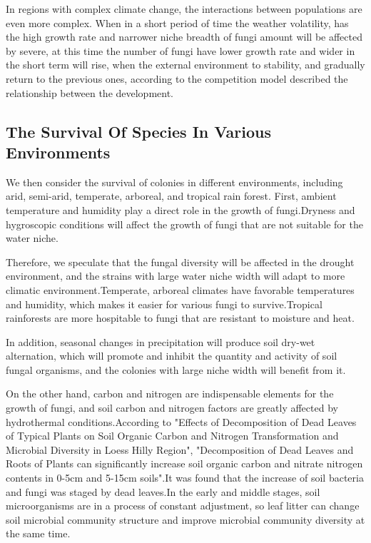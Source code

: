 \documentclass[12pt]{article}
\begin{document}
In regions with complex climate change, the interactions between populations are even more complex. When in a short period of time the weather volatility, has the high growth rate and narrower niche breadth of fungi amount will be affected by severe, at this time the number of fungi have lower growth rate and wider in the short term will rise, when the external environment to stability, and gradually return to the previous ones, according to the competition model described the relationship between the development.\par 

\subsection{The Survival Of Species In Various Environments}
We then consider the survival of colonies in different environments, including arid, semi-arid, temperate, arboreal, and tropical rain forest.
First, ambient temperature and humidity play a direct role in the growth of fungi.Dryness and hygroscopic conditions will affect the growth of fungi that are not suitable for the water niche. \par 

Therefore, we speculate that the fungal diversity will be affected in the drought environment, and the strains with large water niche width will adapt to more climatic environment.Temperate, arboreal climates have favorable temperatures and humidity, which makes it easier for various fungi to survive.Tropical rainforests are more hospitable to fungi that are resistant to moisture and heat.\par 

In addition, seasonal changes in precipitation will produce soil dry-wet alternation, which will promote and inhibit the quantity and activity of soil fungal organisms, and the colonies with large niche width will benefit from it.\par 

On the other hand, carbon and nitrogen are indispensable elements for the growth of fungi, and soil carbon and nitrogen factors are greatly affected by hydrothermal conditions.According to "Effects of Decomposition of Dead Leaves of Typical Plants on Soil Organic Carbon and Nitrogen Transformation and Microbial Diversity in Loess Hilly Region"\cite{12}, "Decomposition of Dead Leaves and Roots of Plants can significantly increase soil organic carbon and nitrate nitrogen contents in 0-5cm and 5-15cm soils".It was found that the increase of soil bacteria and fungi was staged by dead leaves.In the early and middle stages, soil microorganisms are in a process of constant adjustment, so leaf litter can change soil microbial community structure and improve microbial community diversity at the same time.\par 
\end{document}
